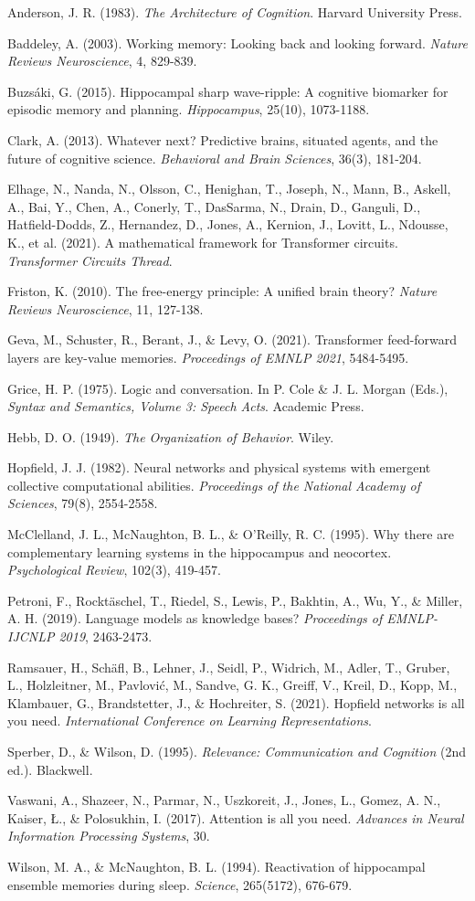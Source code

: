 \documentclass[11pt, a4paper]{article}
\begin{document}
Anderson, J. R. (1983). \textit{The Architecture of Cognition}. Harvard University Press.


Baddeley, A. (2003). Working memory: Looking back and looking forward. \textit{Nature Reviews Neuroscience}, 4, 829-839.


Buzsáki, G. (2015). Hippocampal sharp wave-ripple: A cognitive biomarker for episodic memory and planning. \textit{Hippocampus}, 25(10), 1073-1188.


Clark, A. (2013). Whatever next? Predictive brains, situated agents, and the future of cognitive science. \textit{Behavioral and Brain Sciences}, 36(3), 181-204.


Elhage, N., Nanda, N., Olsson, C., Henighan, T., Joseph, N., Mann, B., Askell, A., Bai, Y., Chen, A., Conerly, T., DasSarma, N., Drain, D., Ganguli, D., Hatfield-Dodds, Z., Hernandez, D., Jones, A., Kernion, J., Lovitt, L., Ndousse, K., et al. (2021). A mathematical framework for Transformer circuits. \textit{Transformer Circuits Thread}.


Friston, K. (2010). The free-energy principle: A unified brain theory? \textit{Nature Reviews Neuroscience}, 11, 127-138.


Geva, M., Schuster, R., Berant, J., \& Levy, O. (2021). Transformer feed-forward layers are key-value memories. \textit{Proceedings of EMNLP 2021}, 5484-5495.


Grice, H. P. (1975). Logic and conversation. In P. Cole \& J. L. Morgan (Eds.), \textit{Syntax and Semantics, Volume 3: Speech Acts}. Academic Press.


Hebb, D. O. (1949). \textit{The Organization of Behavior}. Wiley.


Hopfield, J. J. (1982). Neural networks and physical systems with emergent collective computational abilities. \textit{Proceedings of the National Academy of Sciences}, 79(8), 2554-2558.


McClelland, J. L., McNaughton, B. L., \& O'Reilly, R. C. (1995). Why there are complementary learning systems in the hippocampus and neocortex. \textit{Psychological Review}, 102(3), 419-457.


Petroni, F., Rocktäschel, T., Riedel, S., Lewis, P., Bakhtin, A., Wu, Y., \& Miller, A. H. (2019). Language models as knowledge bases? \textit{Proceedings of EMNLP-IJCNLP 2019}, 2463-2473.


Ramsauer, H., Schäfl, B., Lehner, J., Seidl, P., Widrich, M., Adler, T., Gruber, L., Holzleitner, M., Pavlović, M., Sandve, G. K., Greiff, V., Kreil, D., Kopp, M., Klambauer, G., Brandstetter, J., \& Hochreiter, S. (2021). Hopfield networks is all you need. \textit{International Conference on Learning Representations}.


Sperber, D., \& Wilson, D. (1995). \textit{Relevance: Communication and Cognition} (2nd ed.). Blackwell.


Vaswani, A., Shazeer, N., Parmar, N., Uszkoreit, J., Jones, L., Gomez, A. N., Kaiser, Ł., \& Polosukhin, I. (2017). Attention is all you need. \textit{Advances in Neural Information Processing Systems}, 30.


Wilson, M. A., \& McNaughton, B. L. (1994). Reactivation of hippocampal ensemble memories during sleep. \textit{Science}, 265(5172), 676-679.
\end{document}
